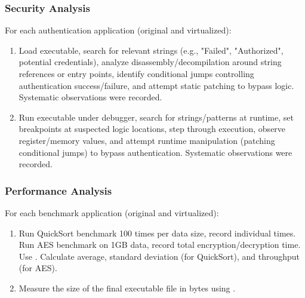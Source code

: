 \subsubsection{Security Analysis}
For each authentication application (original and virtualized):
\begin{enumerate}
    \item {} Load executable, search for relevant strings (e.g., "Failed", "Authorized", potential credentials), analyze disassembly/decompilation around string references or entry points, identify conditional jumps controlling authentication success/failure, and attempt static patching to bypass logic. Systematic observations were recorded.
    \item {} Run executable under debugger, search for strings/patterns at runtime, set breakpoints at suspected logic locations, step through execution, observe register/memory values, and attempt runtime manipulation (patching conditional jumps) to bypass authentication. Systematic observations were recorded.
\end{enumerate}

\subsubsection{Performance Analysis}
For each benchmark application (original and virtualized):
\begin{enumerate}
    \item {} Run QuickSort benchmark 100 times per data size, record individual times. Run AES benchmark on 1GB data, record total encryption/decryption time. Use . Calculate average, standard deviation (for QuickSort), and throughput (for AES).
    \item {} Measure the size of the final executable file in bytes using .
\end{enumerate}

